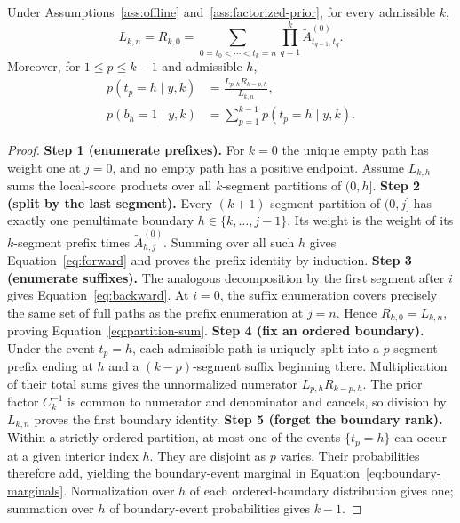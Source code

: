 \begin{theorem}
\label{thm:sum-product}
Under Assumptions~\ref{ass:offline} and~\ref{ass:factorized-prior}, for every admissible $k$,
\begin{equation}
L_{k,n}=R_{k,0}
=\sum_{0=t_0<\cdots<t_k=n}\prod_{q=1}^{k}\widetilde A^{(0)}_{t_{q-1},t_q}.
\label{eq:partition-sum}
\end{equation}
Moreover, for $1\le p\le k-1$ and admissible $h$,
\begin{align}
p(t_p=h\mid y,k)
&=\frac{L_{p,h}R_{k-p,h}}{L_{k,n}},\nonumber\\
p(b_h=1\mid y,k)
&=\sum_{p=1}^{k-1}p(t_p=h\mid y,k).
\label{eq:boundary-marginals}
\end{align}
\end{theorem}
\begin{proof}
\textbf{Step 1 (enumerate prefixes).}
For $k=0$ the unique empty path has weight one at $j=0$, and no empty path has a positive endpoint. Assume $L_{k,h}$ sums the local-score products over all $k$-segment partitions of $(0,h]$.
\textbf{Step 2 (split by the last segment).}
Every $(k+1)$-segment partition of $(0,j]$ has exactly one penultimate boundary $h\in\{k,\ldots,j-1\}$. Its weight is the weight of its $k$-segment prefix times $\widetilde A^{(0)}_{h,j}$. Summing over all such $h$ gives Equation~\eqref{eq:forward} and proves the prefix identity by induction.
\textbf{Step 3 (enumerate suffixes).}
The analogous decomposition by the first segment after $i$ gives Equation~\eqref{eq:backward}. At $i=0$, the suffix enumeration covers precisely the same set of full paths as the prefix enumeration at $j=n$. Hence $R_{k,0}=L_{k,n}$, proving Equation~\eqref{eq:partition-sum}.
\textbf{Step 4 (fix an ordered boundary).}
Under the event $t_p=h$, each admissible path is uniquely split into a $p$-segment prefix ending at $h$ and a $(k-p)$-segment suffix beginning there. Multiplication of their total sums gives the unnormalized numerator $L_{p,h}R_{k-p,h}$. The prior factor $C_k^{-1}$ is common to numerator and denominator and cancels, so division by $L_{k,n}$ proves the first boundary identity.
\textbf{Step 5 (forget the boundary rank).}
Within a strictly ordered partition, at most one of the events $\{t_p=h\}$ can occur at a given interior index $h$. They are disjoint as $p$ varies. Their probabilities therefore add, yielding the boundary-event marginal in Equation~\eqref{eq:boundary-marginals}. Normalization over $h$ of each ordered-boundary distribution gives one; summation over $h$ of boundary-event probabilities gives $k-1$.
\end{proof}

